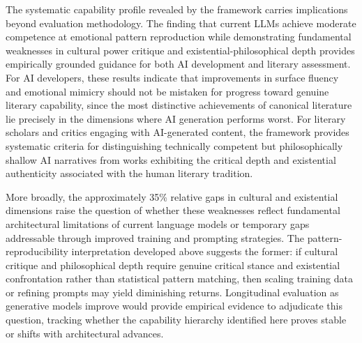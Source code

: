 The systematic capability profile revealed by the framework carries implications beyond evaluation methodology. The finding that current LLMs achieve moderate competence at emotional pattern reproduction while demonstrating fundamental weaknesses in cultural power critique and existential-philosophical depth provides empirically grounded guidance for both AI development and literary assessment. For AI developers, these results indicate that improvements in surface fluency and emotional mimicry should not be mistaken for progress toward genuine literary capability, since the most distinctive achievements of canonical literature lie precisely in the dimensions where AI generation performs worst. For literary scholars and critics engaging with AI-generated content, the framework provides systematic criteria for distinguishing technically competent but philosophically shallow AI narratives from works exhibiting the critical depth and existential authenticity associated with the human literary tradition.

More broadly, the approximately 35\% relative gaps in cultural and existential dimensions raise the question of whether these weaknesses reflect fundamental architectural limitations of current language models or temporary gaps addressable through improved training and prompting strategies. The pattern-reproducibility interpretation developed above suggests the former: if cultural critique and philosophical depth require genuine critical stance and existential confrontation rather than statistical pattern matching, then scaling training data or refining prompts may yield diminishing returns. Longitudinal evaluation as generative models improve would provide empirical evidence to adjudicate this question, tracking whether the capability hierarchy identified here proves stable or shifts with architectural advances.
